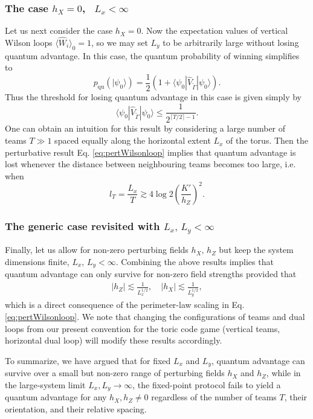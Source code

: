 \documentclass[prb,twocolumn,showpacs,amssymb,superscriptaddress]{revtex4-2}
\begin{document}
\subsubsection{The case $h_X=0$, \, $L_x < \infty$}
Let us next consider the case $h_X = 0$. Now the expectation values of vertical Wilson loops $\langle \hat{W}_i\rangle_0 = 1$, so we may set $L_y$ to be arbitrarily large without losing quantum advantage. In this case, the quantum probability of winning simplifies to
\begin{equation}
p_{\mathrm{qu}}(|\psi_0\rangle) = \frac{1}{2}\left(1 + \langle \psi_0 | \hat{V}_{\widetilde{\Gamma}} | \psi_0\rangle\right).
\end{equation}
Thus the threshold for losing quantum advantage in this case is given simply by
\begin{equation}
\langle \psi_0 | \hat{V}_{\widetilde{\Gamma}} | \psi_0\rangle \leq \frac{1}{2^{\lceil T/2 \rceil-1}}.
\end{equation}
One can obtain an intuition for this result by considering a large number of teams $T \gg 1$ spaced equally along the horizontal extent $L_x$ of the torus. Then the perturbative result Eq. \eqref{eq:pertWilsonloop} implies that quantum advantage is lost whenever the distance between neighbouring teams becomes too large, i.e. when
\begin{equation}
l_T = \frac{L_x}{T} \gtrsim 4 \log{2} \left(\frac{K'}{h_Z}\right)^2.
\end{equation}
\subsubsection{The generic case revisited with $L_x, \, L_y < \infty$}
Finally, let us allow for non-zero perturbing fields $h_X, \, h_Z$ but keep the system dimensions finite, $L_x, \, L_y <\infty$. Combining the above results implies that quantum advantage can only survive for non-zero field strengths provided that
\begin{align}
|h_Z| \lesssim \frac{1}{L_x^{1/2}}, \quad |h_X| \lesssim \frac{1}{L_y^{1/2}},
\end{align}
which is a direct consequence of the perimeter-law scaling in Eq. \eqref{eq:pertWilsonloop}. We note that changing the configurations of teams and dual loops from our present convention\cite{companion} for the toric code game (vertical teams, horizontal dual loop) will modify these results accordingly.

To summarize, we have argued that for fixed $L_x$ and $L_y$, quantum advantage can survive over a small but non-zero range of perturbing fields $h_X$ and $h_Z$, while in the large-system limit $L_x, L_y \to \infty$, the fixed-point protocol fails to yield a quantum advantage for any $h_X, h_Z \neq 0$ regardless of the number of teams $T$, their orientation, and their relative spacing.
\end{document}
